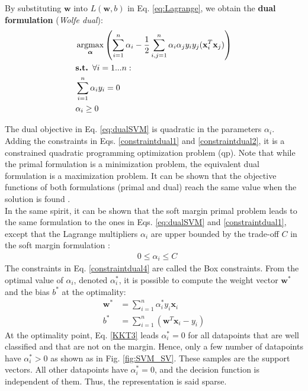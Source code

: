 \noindent By substituting $\textbf{w}$ into $L(\textbf{w},b)$ in Eq. \ref{eq:Lagrange}, we obtain the \textbf{dual formulation} (\textit{Wolfe dual}):
\begin{align}
	& \argmax_{\boldsymbol{\alpha}} \left( 
	\sum\limits_{i=1}^{n} \alpha_i - \frac{1}{2} \sum\limits_{i,j=1}^{n} \alpha_i \alpha_j y_i y_j (\textbf{x}_i ^T \textbf{x}_j) 
	\right) 
	\label{eq:dualSVM}\\
	& \textbf{s.t. } \forall i = 1...n: \nonumber \\
	& \sum\limits_{i=1}^{n}\alpha_i y_i = 0 \label{constraintdual1}\\
	& \alpha_i \geq 0 \label{constraintdual2}
\end{align}

\noindent The dual objective in Eq. \ref{eq:dualSVM} is quadratic in the parameters $\alpha_i$. Adding the constraints in Eqs. \ref{constraintdual1} and \ref{constraintdual2}, it is a constrained quadratic programming optimization problem ({\sc qp}). Note that while the primal formulation is a minimization problem, the equivalent dual formulation is a maximization problem. It can be shown that the objective functions of both formulations (primal and dual) reach the same value when the solution is found \cite{Campbell2011}. \\
In the same spirit, it can be shown that the soft margin primal problem leads to the same formulation to the ones in Eqs. \ref{eq:dualSVM} and \ref{constraintdual1}, except that 
the Lagrange multipliers $\alpha_i$ are upper bounded by the trade-off $C$ in the soft margin formulation \cite{Campbell2011}:
\begin{align}
	& 0 \leq \alpha_i \leq C  \label{constraintdual4}
\end{align}
The constraints in Eq. \ref{constraintdual4} are called the Box constraints. From the optimal value of $\alpha_i$, denoted $\alpha_i^*$, it is possible to compute the weight vector $\textbf{w}^*$ and the bias $b^*$ at the optimality:
\begin{align}
	\textbf{w}^* & = \sum\limits_{i=1}^{n}\alpha_i^* y_i \textbf{x}_i \label{eq:w_dual}\\
	b^* & = \sum\limits_{i=1}^{n} (\textbf{w}^T\textbf{x}_i - y_i)
\end{align}
At the optimality point, Eq. \ref{KKT3} leads $\alpha_i^* = 0$ for all datapoints that are well classified and that are not on the margin. Hence, only a few number of datapoints have $\alpha_i^* > 0$ as shown as in Fig. \ref{fig:SVM_SV}. These samples are the support vectors. All other datapoints have $\alpha_i^*=0$, and the decision function is independent of them. Thus, the representation is said sparse. 

